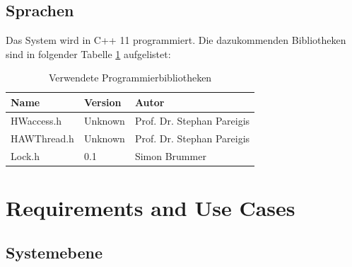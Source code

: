 \documentclass[a4paper, 11pt]{article}
\begin{document}
\subsection{Sprachen}
Das System wird in C++ 11 programmiert. Die dazukommenden Bibliotheken sind in folgender Tabelle \ref{bibl} aufgelistet:
\medskip
\begin{table}[h]
\center
\begin{tabular}{|l|l|l|}
\hline
\textbf{Name}&\textbf{Version}&\textbf{Autor}\\
\hline
HWaccess.h&Unknown&Prof. Dr. Stephan Pareigis\\
\hline
HAWThread.h&Unknown&Prof. Dr. Stephan Pareigis \\
\hline
Lock.h&0.1&Simon Brummer \\
\hline
\end{tabular}
\caption{Verwendete Programmierbibliotheken}
\label{bibl}
\end{table}

\newpage

\section{Requirements and Use Cases}

\subsection{Systemebene}
\end{document}
